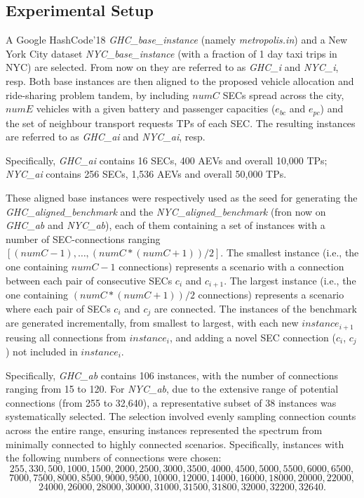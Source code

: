 \subsection{Experimental Setup}
\label{sec:experimental_setup}

A Google HashCode'18 \emph{GHC\_base\_instance} (namely \emph{metropolis.in}) and a New York City dataset  \emph{NYC\_base\_instance}
(with a fraction of 1 day taxi trips in NYC)
are selected. From now on they are referred to as \emph{GHC\_i} and \emph{NYC\_i}, resp.
Both base instances are then aligned to the proposed vehicle allocation and ride-sharing problem tandem, by including
$numC$ SECs spread across the city,
$numE$ vehicles with a given battery and passenger capacities ($e_{bc}$ and $e_{pc}$) and
the set of neighbour transport requests TPs of each SEC. The resulting instances are referred to as
\emph{GHC\_ai} and \emph{NYC\_ai}, resp.

Specifically, \emph{GHC\_ai} contains 16 SECs, 400 AEVs and overall 10,000 TPs;
\emph{NYC\_ai} contains 256 SECs, 1,536 AEVs and overall 50,000 TPs.

These aligned base instances were respectively used as the seed for
generating the \emph{GHC\_aligned\_benchmark} and the \emph{NYC\_aligned\_benchmark}
(fron now on \emph{GHC\_ab} and \emph{NYC\_ab}), each of them containing a
set of instances with a number of SEC-connections ranging $[(numC - 1), \ldots, (numC * (numC + 1))/2]$.
The smallest instance (i.e., the one containing $numC - 1$ connections) represents a scenario with a
connection between each pair of consecutive SECs $c_i$
and $c_{i+1}$. The largest instance (i.e., the one containing $(numC * (numC + 1))/2$ connections) represents a scenario
where each pair of SECs $c_i$ and $c_j$ are connected.
The instances of the benchmark are generated incrementally, from smallest to largest,
with each new $instance_{i+1}$ reusing all connections from $instance_{i}$, and adding a novel SEC connection
($c_i$, $c_j$) not included in $instance_{i}$.

Specifically, \emph{GHC\_ab} contains 106 instances, with the number of connections ranging from 15 to 120. For \emph{NYC\_ab}, due to the extensive range of potential connections (from 255 to 32,640), a representative subset of 38 instances was systematically selected. The selection involved evenly sampling connection counts across the entire range, ensuring instances represented the spectrum from minimally connected to highly connected scenarios. Specifically, instances with the following numbers of connections were chosen:  
\[255, 330, 500, 1000, 1500, 2000, 2500, 3000, 3500, 4000, 4500, 5000, 5500, 6000, 6500,\]
\[7000, 7500, 8000, 8500, 9000, 9500, 10000, 12000, 14000, 16000, 18000, 20000, 22000,\] 
\[24000, 26000, 28000, 30000, 31000, 31500, 31800, 32000, 32200, 32640.\]

